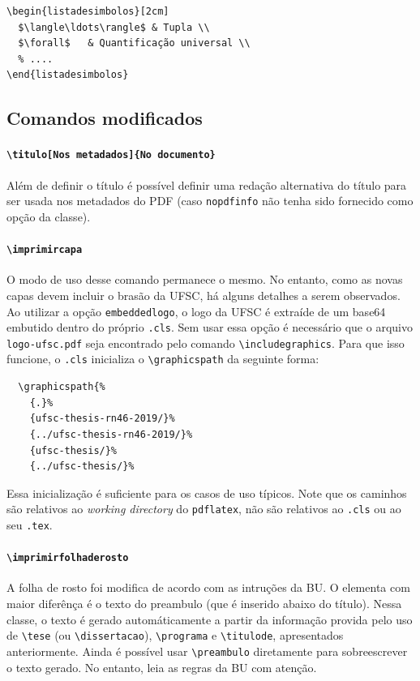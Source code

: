 \documentclass[embeddedlogo]{ufsc-thesis-rn46-2019}
\newcommand{\lacmd}[1]{\texttt{\textbackslash{}#1}}
\begin{document}
\begin{verbatim}
\begin{listadesimbolos}[2cm]
  $\langle\ldots\rangle$ & Tupla \\
  $\forall$   & Quantificação universal \\
  % ....
\end{listadesimbolos}
\end{verbatim}

\subsection{Comandos \abnTeX{} modificados}

\paragraph*{\lacmd{titulo[Nos metadados]\{No documento\}}} Além de definir o título é
possível definir uma redação alternativa do título para ser usada nos metadados
do PDF (caso \texttt{nopdfinfo} não tenha sido fornecido como opção da classe).

\paragraph*{\lacmd{imprimircapa}} O modo de uso desse comando permanece o
mesmo. No entanto, como as novas capas devem incluir o brasão da UFSC, há alguns
detalhes a serem observados. Ao utilizar a opção \texttt{embeddedlogo}, o logo
da UFSC é extraíde de um base64 embutido dentro do próprio \texttt{.cls}. Sem
usar essa opção é necessário que o arquivo \texttt{logo-ufsc.pdf} seja
encontrado pelo comando \lacmd{includegraphics}. Para que isso funcione, o
\texttt{.cls} inicializa o \lacmd{graphicspath} da seguinte forma:

\begin{verbatim}
  \graphicspath{%
    {.}%
    {ufsc-thesis-rn46-2019/}%
    {../ufsc-thesis-rn46-2019/}%
    {ufsc-thesis/}%
    {../ufsc-thesis/}%
\end{verbatim}

Essa inicialização é suficiente para os casos de uso típicos. Note que os
caminhos são relativos ao \emph{working directory} do \texttt{pdflatex}, não são
relativos ao \texttt{.cls} ou ao seu \texttt{.tex}.

\paragraph*{\lacmd{imprimirfolhaderosto}} A folha de rosto foi modifica de
acordo com as intruções da BU. O elementa com maior diferênça é o texto do
preambulo (que é inserido abaixo do título). Nessa classe, o texto é gerado
automáticamente a partir da informação provida pelo uso de \lacmd{tese} (ou
\lacmd{dissertacao}), \lacmd{programa} e \lacmd{titulode}, apresentados
anteriormente. Ainda é possível usar \lacmd{preambulo} diretamente para
sobreescrever o texto gerado. No entanto, leia as regras da BU com atenção.
\end{document}
